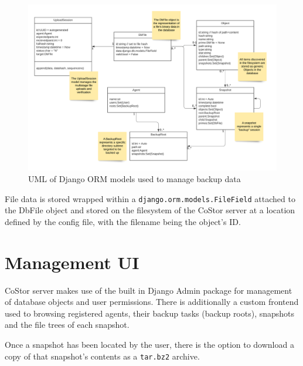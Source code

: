 \documentclass[bsc,frontabs,twoside,singlespacing,parskip,deptreport]{infthesis}     %
\begin{document}
\begin{figure}[h]
	\includegraphics[width=0.82\paperwidth]{img/serverfileuml}
	\caption{UML of Django ORM models used to manage backup data}
	\label{serverdjangofileuml}
\end{figure}

File data is stored wrapped within a \texttt{django.orm.models.FileField} attached to the DbFile 
object and stored on the filesystem of the CoStor server at a location defined by the config file,
with the filename being the object's ID.

\section{Management UI}

CoStor server makes use of the built in Django Admin package for management of database objects 
and user permissions. There is additionally a custom frontend used to browsing registered agents,
their backup tasks (backup roots), snapshots and the file trees of each snapshot.

Once a snapshot has been located by the user, there is the option to download a copy of that
snapshot's contents as a \texttt{tar.bz2} archive.
\end{document}
